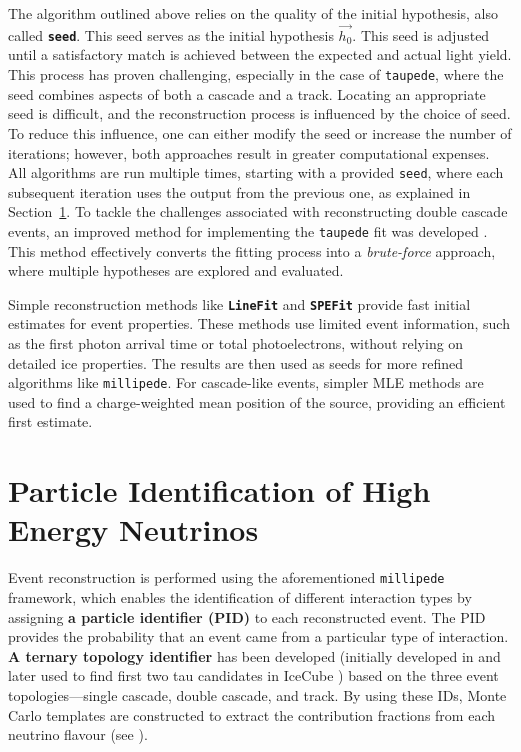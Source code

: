 The algorithm outlined above relies on the quality of the initial hypothesis, also called \textbf{\texttt{seed}}. This seed serves as the initial hypothesis $\vec{h_0}$. This seed is adjusted until a satisfactory match is achieved between the expected and actual light yield. This process has proven challenging, especially in the case of \texttt{taupede}, where the seed combines aspects of both a cascade and a track. Locating an appropriate seed is difficult, and the reconstruction process is influenced by the choice of seed. To reduce this influence, one can either modify the seed or increase the number of iterations; however, both approaches result in greater computational expenses. All algorithms are run multiple times, starting with a provided \texttt{seed}, where each subsequent iteration uses the output from the previous one, as explained in Section~\ref{sec:PID}. To tackle the challenges associated with reconstructing double cascade events, an improved method for implementing the \texttt{taupede} fit was developed . This method effectively converts the fitting process into a \emph{brute-force} approach, where multiple hypotheses are explored and evaluated.  

Simple reconstruction methods like \textbf{\texttt{LineFit}} and \textbf{\texttt{SPEFit}} provide fast initial estimates for event properties. These methods use limited event information, such as the first photon arrival time or total photoelectrons, without relying on detailed ice properties. The results are then used as seeds for more refined algorithms like \texttt{millipede}. For cascade-like events, simpler MLE methods are used to find a charge-weighted mean position of the source, providing an efficient first estimate.

\section{Particle Identification of High Energy Neutrinos}
\label{sec:PID}
Event reconstruction is performed using the aforementioned \texttt{millipede} framework, which enables the identification of different interaction types by assigning \textbf{a particle identifier (PID)} to each reconstructed event. The PID provides the probability that an event came from a particular type of interaction. \textbf{A ternary topology identifier} has been developed (initially developed in \cite{marcel_thesis} and later used to find first two tau candidates in IceCube ) based on the three event topologies—single cascade, double cascade, and track. By using these IDs, Monte Carlo templates are constructed to extract the contribution fractions from each neutrino flavour (see ).

